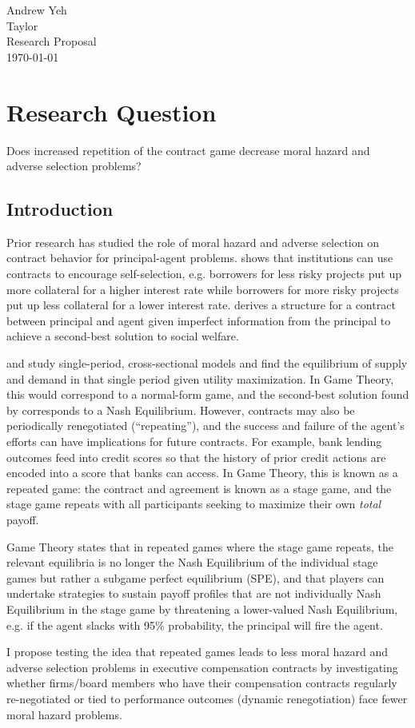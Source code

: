 \documentclass{article}
\begin{document}
\begin{flushleft}
Andrew Yeh \\
Taylor \\
Research Proposal\\
\today{}\\
\end{flushleft}

\section{Research Question}
Does increased repetition of the contract game decrease moral hazard and adverse selection problems?
\subsection{Introduction}
Prior research has studied the role of moral hazard and adverse selection on contract behavior for principal-agent problems. \cite{besterRationing} shows that institutions can use contracts to encourage self-selection, e.g. borrowers for less risky projects put up more collateral for a higher interest rate while borrowers for more risky projects put up less collateral for a lower interest rate. \cite{holmstrom} derives a structure for a contract between principal and agent given imperfect information from the principal to achieve a second-best solution to social welfare. 
\par \cite{besterRationing} and \cite{holmstrom} study single-period, cross-sectional models and find the equilibrium of supply and demand in that single period given utility maximization. In Game Theory, this would correspond to a normal-form game, and the second-best solution found by \cite{holmstrom} corresponds to a Nash Equilibrium. However, contracts may also be periodically renegotiated (``repeating''), and the success and failure of the agent's efforts can have implications for future contracts. For example, bank lending outcomes feed into credit scores so that the history of prior credit actions are encoded into a score that banks can access. In Game Theory, this is known as a repeated game: the contract and agreement is known as a stage game, and the stage game repeats with all participants seeking to maximize their own \emph{total} payoff. 
\par Game Theory states that in repeated games where the stage game repeats, the relevant equilibria is no longer the Nash Equilibrium of the individual stage games but rather a subgame perfect equilibrium (SPE), and that players can undertake strategies to sustain payoff profiles that are not individually Nash Equilibrium in the stage game by threatening a lower-valued Nash Equilibrium, e.g. if the agent slacks with 95\% probability, the principal will fire the agent.
\par I propose testing the idea that repeated games leads to less moral hazard and adverse selection problems in executive compensation contracts by investigating whether firms/board members who have their compensation contracts regularly re-negotiated or tied to performance outcomes (dynamic renegotiation) face fewer moral hazard problems.
\end{document}
